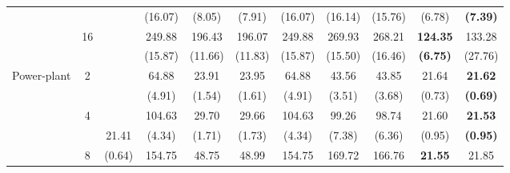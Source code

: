 \documentclass[letterpaper]{article} %
\begin{document}
\begin{table}[!t]
{\begin{tabular}{clcccccccc|cc}
\multicolumn{2}{c}{}                             &                       &                             & (16.07)                   & (8.05)                    & (7.91)                      & (16.07)                   & (16.14)                   & (15.76)                     & (6.78)              & \textbf{(7.39)}       \\
\multicolumn{2}{c}{}                             & \multirow{2}{*}{16}   &                             & 249.88                    & 196.43                    & 196.07                      & 249.88                    & 269.93                    & 268.21                      & \textbf{124.35}     & 133.28                \\
\multicolumn{2}{c}{}                             &                       &                             & (15.87)                   & (11.66)                   & (11.83)                     & (15.87)                   & (15.50)                   & (16.46)                     & \textbf{(6.75)}     & (27.76)               \\ \hline
\multicolumn{2}{c}{\multirow{8}{*}{Power-plant}} & \multirow{2}{*}{2}    &                             & 64.88                     & 23.91                     & 23.95                       & 64.88                     & 43.56                     & 43.85                       & 21.64               & \textbf{21.62}        \\
\multicolumn{2}{c}{}                             &                       &                             & (4.91)                    & (1.54)                    & (1.61)                      & (4.91)                    & (3.51)                    & (3.68)                      & (0.73)              & \textbf{(0.69)}       \\
\multicolumn{2}{c}{}                             & \multirow{2}{*}{4}    &                             & 104.63                    & 29.70                     & 29.66                       & 104.63                    & 99.26                     & 98.74                       & 21.60               & \textbf{21.53}        \\
\multicolumn{2}{c}{}                             &                       & 21.41                       & (4.34)                    & (1.71)                    & (1.73)                      & (4.34)                    & (7.38)                    & (6.36)                      & (0.95)              & \textbf{(0.95)}       \\
\multicolumn{2}{c}{}                             & \multirow{2}{*}{8}    & (0.64)                      & 154.75                    & 48.75                     & 48.99                       & 154.75                    & 169.72                    & 166.76                      & \textbf{21.55}      & 21.85                 \\

\end{tabular}}
\end{table}
\end{document}

